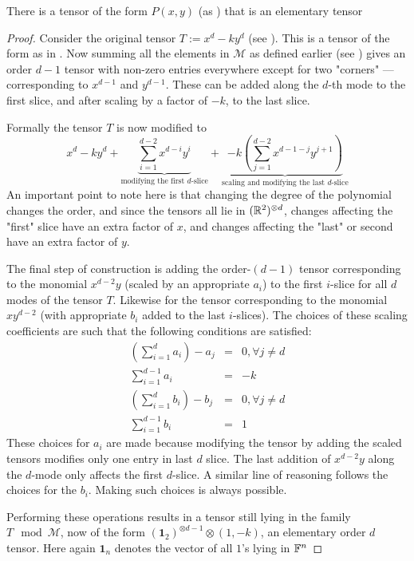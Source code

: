\documentclass[../Lael_John_MasterThesis_Draft.tex]{subfiles}
\begin{document}
\begin{proposition}
    There is a tensor of the form $P(x,y)$ (as ) that is an elementary tensor 
\end{proposition}\label{prop:rankatmost1}
\begin{proof}
    Consider the original tensor $T := x^d - ky^d$ (see ). This is a tensor of the form as in . Now summing all the elements in $\mathcal{M}$ as defined earlier (see ) gives an order $d-1$ tensor with non-zero entries everywhere except for two "corners" --- corresponding to $x^{d-1}$ and $y^{d-1}$. These can be added along the $d$-th mode to the first slice, and after scaling by a factor of $-k$, to the last slice.
   
    Formally the tensor $T$ is now modified to $$x^d - ky^d + \underbrace{\sum_{i=1}^{d-2} x^{d-i}y^i}_{\text{modifying the first $d$-slice}} + \underbrace{-k\left(\sum_{j=1}^{d-2} x^{d-1-j}y^{j+1}\right)}_{\text{scaling and modifying the last $d$-slice}}$$An important point to note here is that changing the degree of the polynomial changes the order, and since the tensors all lie in $(\mathbb{R}^2)^{\otimes d}$, changes affecting the "first" slice have an extra factor of $x$, and changes affecting the "last" or second have an extra factor of $y$.

    The final step of construction is adding the order-$(d-1)$ tensor corresponding to the monomial $x^{d-2}y$ (scaled by an appropriate $a_i$) to the first $i$-slice for all $d$ modes of the tensor $T$. Likewise for the tensor corresponding to the monomial $xy^{d-2}$ (with appropriate $b_i$ added to the last $i$-slices). The choices of these scaling coefficients are such that the following conditions are satisfied: \begin{eqnarray}
        \left(\sum_{i=1}^{d} a_i\right) - a_j &=& 0, \forall j \neq d\\
        \sum_{i=1}^{d-1} a_i  &=& -k\\
        \left(\sum_{i=1}^{d} b_i\right) - b_j &=& 0, \forall j \neq d\\
        \sum_{i=1}^{d-1} b_i  &=& 1
    \end{eqnarray}
    These choices for $a_i$ are made because modifying the tensor by adding the scaled tensors modifies only one entry in last $d$ slice. The last addition of $x^{d-2}y$ along the $d$-mode only affects the first $d$-slice. A similar line of reasoning follows the choices for the $b_i$. Making such choices is always possible.

    Performing these operations results in a tensor still lying in the family $T\mod \mathcal{M}$, now of the form $(\mathbf{1}_2)^{\otimes d-1} \otimes (1, -k)$, an elementary order $d$ tensor. Here again $\mathbf{1}_n$ denotes the vector of all $1$'s lying in $\mathbb{F}^n$
\end{proof}
\end{document}
